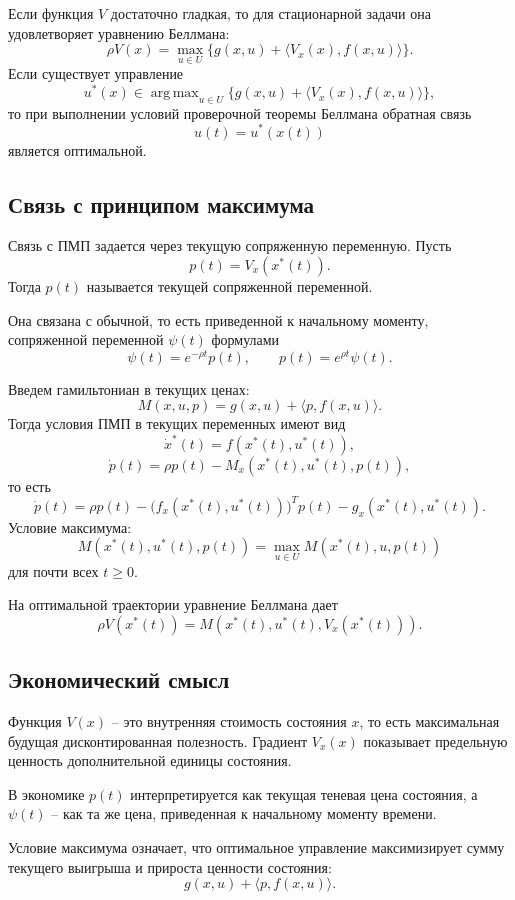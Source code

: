 \documentclass[12pt,a4paper]{article}
\DeclareMathOperator*{\argmax}{arg\,max}
\begin{document}
Если функция \(V\) достаточно гладкая, то для стационарной задачи она удовлетворяет уравнению Беллмана:
\[
    \rho V(x)=\max_{u\in U}\{g(x,u)+\langle V_x(x),f(x,u)\rangle\}.
\]
Если существует управление
\[
    u^*(x)\in\argmax_{u\in U}\{g(x,u)+\langle V_x(x),f(x,u)\rangle\},
\]
то при выполнении условий проверочной теоремы Беллмана обратная связь
\[
    u(t)=u^*(x(t))
\]
является оптимальной.

\subsection{Связь с принципом максимума}

Связь с ПМП задается через текущую сопряженную переменную. Пусть
\[
    p(t)=V_x(x^*(t)).
\]
Тогда \(p(t)\) называется текущей сопряженной переменной.

Она связана с обычной, то есть приведенной к начальному моменту, сопряженной переменной \(\psi(t)\) формулами
\[
    \psi(t)=e^{-\rho t}p(t),
    \qquad
    p(t)=e^{\rho t}\psi(t).
\]

Введем гамильтониан в текущих ценах:
\[
    M(x,u,p)=g(x,u)+\langle p,f(x,u)\rangle.
\]
Тогда условия ПМП в текущих переменных имеют вид
\[
    \dot x^*(t)=f(x^*(t),u^*(t)),
\]
\[
    \dot p(t)=\rho p(t)-M_x(x^*(t),u^*(t),p(t)),
\]
то есть
\[
    \dot p(t)=\rho p(t)-\bigl(f_x(x^*(t),u^*(t))\bigr)^Tp(t)-g_x(x^*(t),u^*(t)).
\]
Условие максимума:
\[
    M(x^*(t),u^*(t),p(t))
    =\max_{u\in U}M(x^*(t),u,p(t))
\]
для почти всех \(t\ge0\).

На оптимальной траектории уравнение Беллмана дает
\[
    \rho V(x^*(t))=M(x^*(t),u^*(t),V_x(x^*(t))).
\]

\subsection{Экономический смысл}

Функция \(V(x)\) -- это внутренняя стоимость состояния \(x\), то есть максимальная будущая дисконтированная полезность. Градиент \(V_x(x)\) показывает предельную ценность дополнительной единицы состояния.

В экономике \(p(t)\) интерпретируется как текущая теневая цена состояния, а \(\psi(t)\) -- как та же цена, приведенная к начальному моменту времени.

Условие максимума означает, что оптимальное управление максимизирует сумму текущего выигрыша и прироста ценности состояния:
\[
    g(x,u)+\langle p,f(x,u)\rangle.
\]
\end{document}
